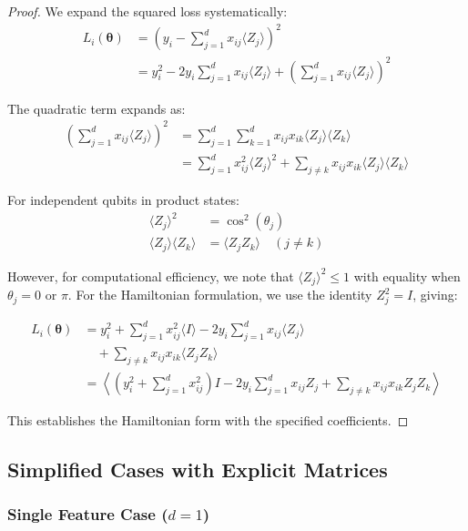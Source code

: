 \documentclass[11pt]{article}
\begin{document}
\begin{proof}
We expand the squared loss systematically:
\begin{align}
L_i(\bm{\theta}) &= \left(y_i - \sum_{j=1}^d x_{ij} \langle Z_j \rangle\right)^2 \\
&= y_i^2 - 2y_i \sum_{j=1}^d x_{ij} \langle Z_j \rangle + \left(\sum_{j=1}^d x_{ij} \langle Z_j \rangle\right)^2
\end{align}

The quadratic term expands as:
\begin{align}
\left(\sum_{j=1}^d x_{ij} \langle Z_j \rangle\right)^2 &= \sum_{j=1}^d \sum_{k=1}^d x_{ij} x_{ik} \langle Z_j \rangle \langle Z_k \rangle \\
&= \sum_{j=1}^d x_{ij}^2 \langle Z_j \rangle^2 + \sum_{j \neq k} x_{ij} x_{ik} \langle Z_j \rangle \langle Z_k \rangle
\end{align}

For independent qubits in product states:
\begin{align}
\langle Z_j \rangle^2 &= \cos^2(\theta_j) \\
\langle Z_j \rangle \langle Z_k \rangle &= \langle Z_j Z_k \rangle \quad (j \neq k)
\end{align}

However, for computational efficiency, we note that $\langle Z_j \rangle^2 \leq 1$ with equality when $\theta_j = 0$ or $\pi$. For the Hamiltonian formulation, we use the identity $Z_j^2 = I$, giving:

\begin{align}
L_i(\bm{\theta}) &= y_i^2 + \sum_{j=1}^d x_{ij}^2 \langle I \rangle - 2y_i \sum_{j=1}^d x_{ij} \langle Z_j \rangle \\
&\quad + \sum_{j \neq k} x_{ij} x_{ik} \langle Z_j Z_k \rangle \\
&= \left\langle \left(y_i^2 + \sum_{j=1}^d x_{ij}^2\right) I - 2y_i \sum_{j=1}^d x_{ij} Z_j + \sum_{j \neq k} x_{ij} x_{ik} Z_j Z_k \right\rangle
\end{align}

This establishes the Hamiltonian form with the specified coefficients.
\end{proof}

\subsection{Simplified Cases with Explicit Matrices}

\subsubsection{Single Feature Case ($d=1$)}
\end{document}
